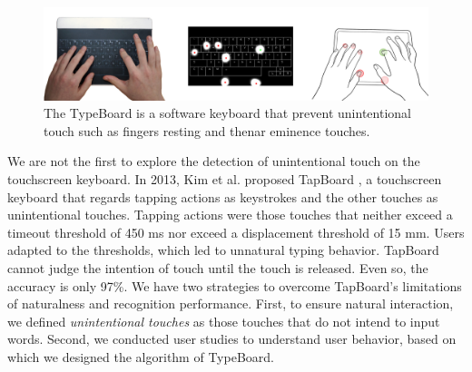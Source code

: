 
\begin{figure}[!htbp]
	\centering
	\includegraphics[width=\textwidth]{figures/teaser.png}
	\caption{The TypeBoard is a software keyboard that prevent unintentional touch such as fingers resting and thenar eminence touches. }
	\label{fig:teaser}
\end{figure}{}



We are not the first to explore the detection of unintentional touch on the touchscreen keyboard. In 2013, Kim et al. proposed TapBoard \cite{2013-TapBoard}, a touchscreen keyboard that regards tapping actions as keystrokes and the other touches as unintentional touches. Tapping actions were those touches that neither exceed a timeout threshold of 450 ms nor exceed a displacement threshold of 15 mm. Users adapted to the thresholds, which led to unnatural typing behavior. TapBoard cannot judge the intention of touch until the touch is released. Even so, the accuracy is only 97\%. We have two strategies to overcome TapBoard's limitations of naturalness and recognition performance. First, to ensure natural interaction, we defined \emph{unintentional touches} as those touches that do not intend to input words. Second, we conducted user studies to understand user behavior, based on which we designed the algorithm of TypeBoard.

